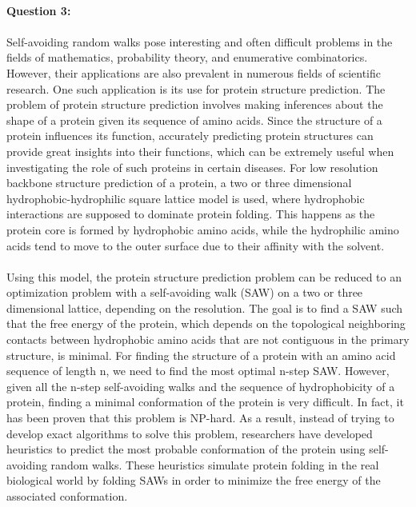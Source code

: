 \documentclass[12pt]{article}
\begin{document}
\pagebreak

\paragraph{Question 3:}

\paragraph{} Self-avoiding random walks pose interesting and often difficult problems in the fields of mathematics, probability theory, and enumerative combinatorics. However, their applications are also prevalent in numerous fields of scientific research. One such application is its use for protein structure prediction. The problem of protein structure prediction involves making inferences about the shape of a protein given its sequence of amino acids. Since the structure of a protein influences its function, accurately predicting protein structures can provide great insights into their functions, which can be extremely useful when investigating the role of such proteins in certain diseases. For low resolution backbone structure prediction of a protein, a two or three dimensional hydrophobic-hydrophilic square lattice model is used, where hydrophobic interactions are supposed to dominate protein folding. This happens as the protein core is formed by hydrophobic amino acids, while the hydrophilic amino acids tend to move to the outer surface due to their affinity with the solvent.

\paragraph{} Using this model, the protein structure prediction problem can be reduced to an optimization problem with a self-avoiding walk (SAW) on a two or three dimensional lattice, depending on the resolution. The goal is to find a SAW such that the free energy of the protein, which depends on the topological neighboring contacts between hydrophobic amino acids that are not contiguous in the primary structure, is minimal. For finding the structure of a protein with an amino acid sequence of length n, we need to find the most optimal n-step SAW. However, given all the n-step self-avoiding walks and the sequence of hydrophobicity of a protein, finding a minimal conformation of the protein is very difficult. In fact, it has been proven that this problem is NP-hard. As a result, instead of trying to develop exact algorithms to solve this problem, researchers have developed heuristics to predict the most probable conformation of the protein using self-avoiding random walks. These heuristics simulate protein folding in the real biological world by folding SAWs in order to minimize the free energy of the associated conformation.
\end{document}
